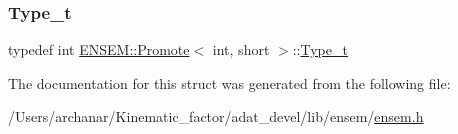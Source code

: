 \subsubsection{\texorpdfstring{Type\_t}{Type\_t}\hspace{0.1cm}{\footnotesize\ttfamily [2/2]}}
{\footnotesize\ttfamily typedef int \mbox{\hyperlink{structENSEM_1_1Promote}{E\+N\+S\+E\+M\+::\+Promote}}$<$ int, short $>$\+::\mbox{\hyperlink{structENSEM_1_1Promote_3_01int_00_01short_01_4_ad2e469fb4504abcc6e15dac9af8a8078}{Type\+\_\+t}}}



The documentation for this struct was generated from the following file\+:\begin{DoxyCompactItemize}
\item 
/\+Users/archanar/\+Kinematic\+\_\+factor/adat\+\_\+devel/lib/ensem/\mbox{\hyperlink{lib_2ensem_2ensem_8h}{ensem.\+h}}\end{DoxyCompactItemize}

